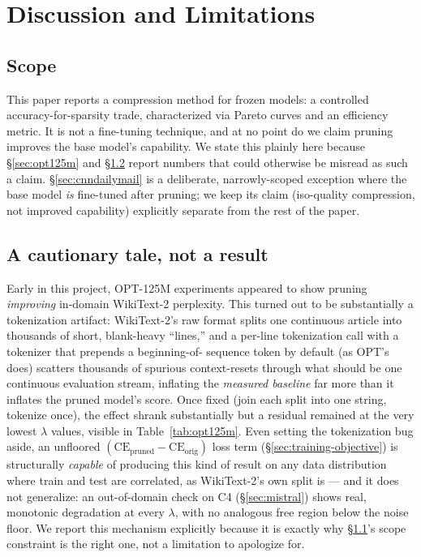 \documentclass[11pt]{article}
\begin{document}
\section{Discussion and Limitations}
\label{sec:discussion}

\subsection{Scope}
\label{sec:scope}

This paper reports a compression method for frozen models: a controlled
accuracy-for-sparsity trade, characterized via Pareto curves and an
efficiency metric. It is not a fine-tuning technique, and at no point do we
claim pruning improves the base model's capability. We state this plainly
here because \S\ref{sec:opt125m} and \S\ref{sec:cautionary-tale} report numbers that could otherwise be
misread as such a claim. \S\ref{sec:cnndailymail} is a deliberate, narrowly-scoped
exception where the base model \emph{is} fine-tuned after pruning; we keep
its claim (iso-quality compression, not improved capability) explicitly
separate from the rest of the paper.

\subsection{A cautionary tale, not a result}
\label{sec:cautionary-tale}

Early in this project, OPT-125M experiments appeared to show pruning
\emph{improving} in-domain WikiText-2 perplexity. This turned out to be
substantially a tokenization artifact: WikiText-2's raw format splits one
continuous article into thousands of short, blank-heavy ``lines,'' and a
per-line tokenization call with a tokenizer that prepends a beginning-of-
sequence token by default (as OPT's does) scatters thousands of spurious
context-resets through what should be one continuous evaluation stream,
inflating the \emph{measured baseline} far more than it inflates the pruned
model's score. Once fixed (join each split into one string, tokenize once),
the effect shrank substantially but a residual remained at the very lowest
$\lambda$ values, visible in Table~\ref{tab:opt125m}. Even setting the tokenization bug
aside, an unfloored $(\mathrm{CE}_{\text{pruned}} - \mathrm{CE}_{\text{orig}})$
loss term (\S\ref{sec:training-objective}) is structurally \emph{capable} of producing this kind of result
on any data distribution where train and test are correlated, as WikiText-2's
own split is --- and it does not generalize: an out-of-domain check on C4 (\S\ref{sec:mistral})
shows real, monotonic degradation at every $\lambda$, with no analogous
free region below the noise floor. We report this mechanism explicitly
because it is exactly why \S\ref{sec:scope}'s scope constraint is the right one, not a
limitation to apologize for.
\end{document}
